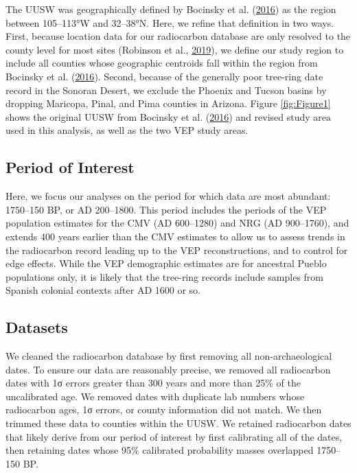 \documentclass[
]{article}
\begin{document}
The UUSW was geographically defined by Bocinsky et al. (\protect\hyperlink{ref-Bocinsky2016}{2016}) as the region between 105--113°W and 32--38°N. Here, we refine that definition in two ways. First, because location data for our radiocarbon database are only resolved to the county level for most sites (Robinson et al., \protect\hyperlink{ref-Robinson2019}{2019}), we define our study region to include all counties whose geographic centroids fall within the region from Bocinsky et al. (\protect\hyperlink{ref-Bocinsky2016}{2016}). Second, because of the generally poor tree-ring date record in the Sonoran Desert, we exclude the Phoenix and Tucson basins by dropping Maricopa, Pinal, and Pima counties in Arizona. Figure \ref{fig:Figure1} shows the original UUSW from Bocinsky et al. (\protect\hyperlink{ref-Bocinsky2016}{2016}) and revised study area used in this analysis, as well as the two VEP study areas.

\hypertarget{period-of-interest}{%
\subsection*{Period of Interest}\label{period-of-interest}}

Here, we focus our analyses on the period for which data are most abundant: 1750--150 BP, or AD 200--1800. This period includes the periods of the VEP population estimates for the CMV (AD 600--1280) and NRG (AD 900--1760), and extends 400 years earlier than the CMV estimates to allow us to assess trends in the radiocarbon record leading up to the VEP reconstructions, and to control for edge effects. While the VEP demographic estimates are for ancestral Pueblo populations only, it is likely that the tree-ring records include samples from Spanish colonial contexts after AD 1600 or so.

\hypertarget{datasets}{%
\subsection*{Datasets}\label{datasets}}

We cleaned the radiocarbon database by first removing all non-archaeological dates. To ensure our data are reasonably precise, we removed all radiocarbon dates with 1σ errors greater than 300 years and more than 25\% of the uncalibrated age. We removed dates with duplicate lab numbers whose radiocarbon ages, 1σ errors, or county information did not match. We then trimmed these data to counties within the UUSW. We retained radiocarbon dates that likely derive from our period of interest by first calibrating all of the dates, then retaining dates whose 95\% calibrated probability masses overlapped 1750--150 BP.
\end{document}
